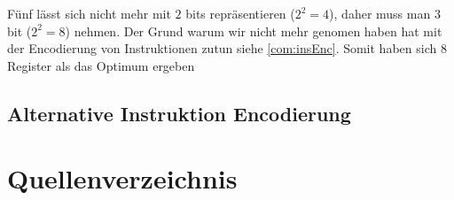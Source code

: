 \documentclass{scrartcl}
\begin{document}
Fünf lässt sich nicht mehr mit $2$ bits repräsentieren ($2^2 = 4$), daher muss man $3$ bit ($2^2 = 8$) nehmen. Der Grund warum wir nicht mehr genomen haben hat mit der Encodierung von Instruktionen zutun siehe \autoref{com:insEnc}. Somit haben sich $8$ Register als das Optimum ergeben

\subsection{\label{com:insEnc}Alternative Instruktion Encodierung}

\section{\label{section:security}}

\section{Quellenverzeichnis}

\printbibliography{}
\end{document}
